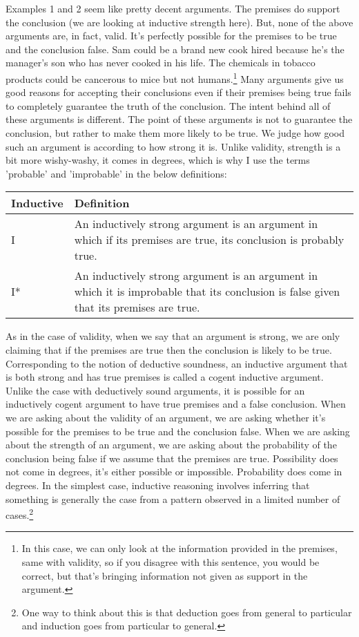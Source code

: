 Examples 1 and 2 seem like pretty decent arguments. The premises do support the conclusion (we are looking at inductive strength here). But, none of the above arguments are, in fact, valid. It's perfectly possible for the premises to be true and the conclusion false. Sam could be a brand new cook hired because he’s the manager’s son who has never cooked in his life. The chemicals in tobacco products could be cancerous to mice but not humans.\footnote{In this case, we can only look at the information provided in the premises, same with validity, so if you disagree with this sentence, you would be correct, but that's bringing information not given as support in the argument.} Many arguments give us good reasons for accepting their conclusions even if their premises being true fails to completely guarantee the truth of the conclusion.  The intent behind all of these arguments is different. The point of these arguments is not to guarantee the conclusion, but rather to make them more likely to be true.  We judge how good such an argument is according to how strong it is.  Unlike validity, strength is a bit more wishy-washy, it comes in degrees, which is why I use the terms 'probable' and 'improbable' in the below definitions:

\begin{tabular}{p{1in}|p{4.5in}}
Inductive&Definition\\\hline
I &An inductively strong argument is an argument in which if its premises are true, its conclusion is probably true.\\
I* &An inductively strong argument is an argument in which it is improbable that its conclusion is false given that its premises are true.
\end{tabular}

As in the case of validity, when we say that an argument is strong, we are only claiming that if the premises are true then the conclusion is likely to be true. Corresponding to the notion of deductive soundness, an inductive argument that is both strong and has true premises is called a cogent inductive argument. Unlike the case with deductively sound arguments, it is possible for an inductively cogent argument to have true premises and a false conclusion. When we are asking about the validity of an argument, we are asking whether it's possible for the premises to be true and the conclusion false. When we are asking about the strength of an argument, we are asking about the probability of the conclusion being false if we assume that the premises are true.  Possibility does not come in degrees, it's either possible or impossible. Probability does come in degrees. In the simplest case, inductive reasoning involves inferring that something is generally the case from a pattern observed in a limited number of cases.\footnote{One way to think about this is that deduction goes from general to particular and induction goes from particular to general.}

